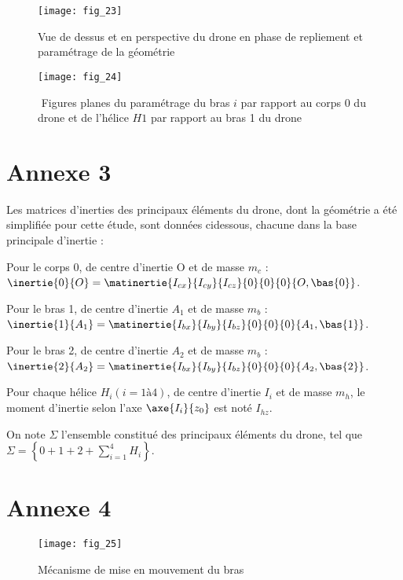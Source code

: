 \begin{figure}[H]
\centering
\texttt{[image: fig\_23]}
\caption{\label{fig:23}  Vue de dessus et en perspective du drone en phase de repliement et paramétrage de la géométrie}
\end{figure}


\begin{figure}[H]
\centering
\texttt{[image: fig\_24]}
\caption{\label{fig:24} ­ Figures planes du paramétrage du bras $i$ par rapport au corps 0 du drone et de
l’hélice $H1$ par rapport au bras 1 du drone}
\end{figure}



\section*{Annexe 3}

Les matrices d’inerties des principaux éléments du drone, dont la géométrie a été simplifiée
pour cette étude, sont données ci­dessous, chacune dans la base principale d’inertie :

Pour le corps 0, de centre d’inertie O et de masse $m_c$ : $\inertie{0}{O} = \matinertie{I_{cx}}{I_{cy}}{I_{cz}}{0}{0}{0}{O,\bas{0}}$.

Pour le bras 1, de centre d’inertie $A_1$ et de masse $m_b$ : $\inertie{1}{A_1} = \matinertie{I_{bx}}{I_{by}}{I_{bz}}{0}{0}{0}{A_1,\bas{1}}$.

Pour le bras 2, de centre d’inertie $A_2$ et de masse $m_b$ : $\inertie{2}{A_2} = \matinertie{I_{bx}}{I_{by}}{I_{bz}}{0}{0}{0}{A_2,\bas{2}}$.

Pour chaque hélice $H_i (i = 1 à 4)$, de centre d’inertie $I_i$ et de masse $m_h$, le moment d’inertie
selon l’axe $\axe{I_i}{z_0}$ est noté $I_{hz}$.

On note $\Sigma$ l’ensemble constitué des principaux éléments du drone, tel que $\Sigma = \left\{ 0+1+2+\sum_{i=1}^{4}H_i \right\}$.



\section*{Annexe 4}


\begin{figure}[H]
\centering
\texttt{[image: fig\_25]}
\caption{\label{fig:25} Mécanisme de mise en mouvement du bras}
\end{figure}

